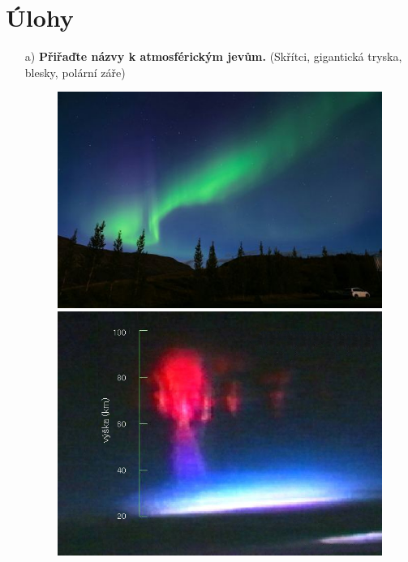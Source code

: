 \documentclass[11pt]{article}
\begin{document}
\section{Úlohy}
\begin{enumerate}

\item[a)] \textbf{Přiřaďte názvy k atmosférickým jevům.}
\newline 
(Skřítci, gigantická tryska, blesky, polární záře)
\begin{figure}[!thp]
\begin{minipage}[b]{0.4\textwidth}
    \includegraphics[width=\textwidth]{resources/aurora.jpg}
    
  \end{minipage}
  \hfill
  \begin{minipage}[b]{0.354\textwidth}
    \includegraphics[width=\textwidth]{resources/skřítek.jpg}
    

\end{minipage}
\end{figure}
\end{enumerate}
\end{document}
